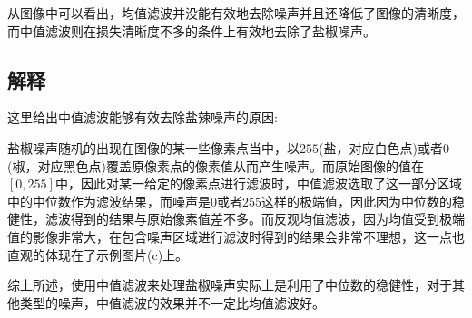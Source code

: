 \documentclass[UTF8]{article}
\begin{document}
	从图像中可以看出，均值滤波并没能有效地去除噪声并且还降低了图像的清晰度，而中值滤波则在损失清晰度不多的条件上有效地去除了盐椒噪声。
	
	\bigbreak
	\subsection{解释}
	这里给出中值滤波能够有效去除盐辣噪声的原因:
	
	盐椒噪声随机的出现在图像的某一些像素点当中，以$255$(盐，对应白色点)或者$0$(椒，对应黑色点)覆盖原像素点的像素值从而产生噪声。而原始图像的值在$[0, 255]$中，因此对某一给定的像素点进行滤波时，中值滤波选取了这一部分区域中的中位数作为滤波结果，而噪声是$0$或者$255$这样的极端值，因此因为中位数的稳健性，滤波得到的结果与原始像素值差不多。而反观均值滤波，因为均值受到极端值的影像非常大，在包含噪声区域进行滤波时得到的结果会非常不理想，这一点也直观的体现在了示例图片(c)上。
	
	\bigbreak
	综上所述，使用中值滤波来处理盐椒噪声实际上是利用了中位数的稳健性，对于其他类型的噪声，中值滤波的效果并不一定比均值滤波好。
\end{document}
